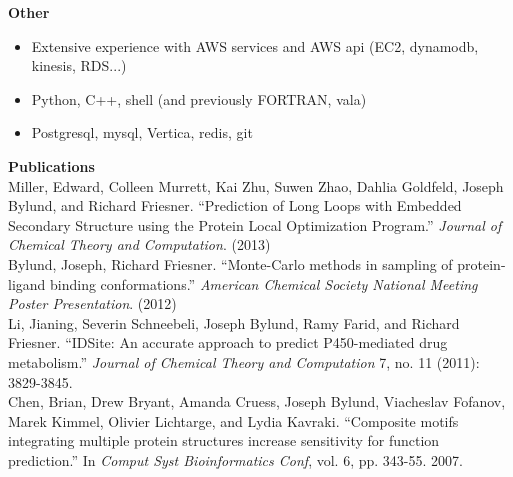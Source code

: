 \vspace{\mybigskip}
\myfontsize{\littleheader}
\textbf{Other}\\
\myfontsize{\bodysize}
\begin{itemize}[topsep=1ex, partopsep=0ex, parsep=0ex, itemsep=0.5ex]
    \item Extensive experience with AWS services and AWS api (EC2, dynamodb, kinesis, RDS...)
    \item Python, C++, shell (and previously FORTRAN, vala)
    \item Postgresql, mysql, Vertica, redis, git
\end{itemize}

\vspace{\mybigskip}
\vspace{\mybigskip}
\myfontsize{\littleheader}
\textbf{Publications}\\
\myfontsize{\bodysize}
\vspace{1ex}
Miller, Edward, Colleen Murrett, Kai Zhu, Suwen Zhao, Dahlia Goldfeld, Joseph Bylund, and Richard Friesner. ``Prediction of Long Loops with Embedded Secondary Structure using the Protein Local Optimization Program.'' \textit{Journal of Chemical Theory and Computation}. (2013)\\
\vspace{1ex}
Bylund, Joseph, Richard Friesner. ``Monte-Carlo methods in sampling of protein-ligand binding conformations.'' \textit{American Chemical Society National Meeting Poster Presentation}. (2012)\\
\vspace{1ex}
Li, Jianing, Severin Schneebeli, Joseph Bylund, Ramy Farid, and Richard Friesner. ``IDSite: An accurate approach to predict P450-mediated drug metabolism.'' \textit{Journal of Chemical Theory and Computation} 7, no. 11 (2011): 3829-3845.\\
\vspace{1ex}
Chen, Brian, Drew Bryant, Amanda Cruess, Joseph Bylund, Viacheslav Fofanov, Marek Kimmel, Olivier Lichtarge, and Lydia Kavraki. ``Composite motifs integrating multiple protein structures increase sensitivity for function prediction.'' In \textit{Comput Syst Bioinformatics Conf}, vol. 6, pp. 343-55. 2007.\\
